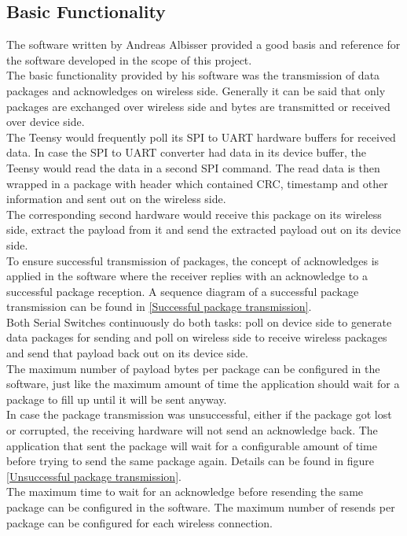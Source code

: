 \subsection{Basic Functionality}
The software written by Andreas Albisser provided a good basis and reference for the software developed in the scope of this project.\\
The basic functionality provided by his software was the transmission of data packages and acknowledges on wireless side. Generally it can be said that only packages are exchanged over wireless side and bytes are transmitted or received over device side. \\
The Teensy would frequently poll its SPI to UART hardware buffers for received data. In case the SPI to UART converter had data in its device buffer, the Teensy would read the data in a second SPI command. The read data is then wrapped in a package with header which contained CRC, timestamp and other information and sent out on the wireless side.\\
The corresponding second hardware would receive this package on its wireless side, extract the payload from it and send the extracted payload out on its device side. \\
To ensure successful transmission of packages, the concept of acknowledges is applied in the software where the receiver replies with an acknowledge to a successful package reception. A sequence diagram of a successful package transmission can be found in \autoref{Successful package transmission}.\\
Both Serial Switches continuously do both tasks: poll on device side to generate data packages for sending and poll on wireless side to receive wireless packages and send that payload back out on its device side.\\ 
%
The maximum number of payload bytes per package can be configured in the software, just like the maximum amount of time the application should wait for a package to fill up until it will be sent anyway.\\
In case the package transmission was unsuccessful, either if the package got lost or corrupted, the receiving hardware will not send an acknowledge back. The application that sent the package will wait for a configurable amount of time before trying to send the same package again. Details can be found in figure \autoref{Unsuccessful package transmission}.\\
The maximum time to wait for an acknowledge before resending the same package can be configured in the software. The maximum number of resends per package can be configured for each wireless connection. \\
%
%
